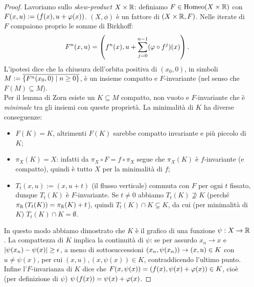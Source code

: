 \begin{proof}Lavoriamo sullo \emph{skew-product} $X\times\mathbb{R}$: definiamo $F\in\operatorname{Homeo}(X\times\mathbb{R})$
con $F(x,u):=\left(f(x),u+\varphi(x)\right)$. $(X,\phi)$ è un fattore di $(X\times\mathbb{R},F)$.
Nelle iterate di $F$ compaiono proprio le somme di Birkhoff:
\[ F^n(x,u)=\left(f^n(x),u+\sum_{j=0}^{n-1}(\varphi\circ f^j)(x)\right). \]
L'ipotesi dice che la chiusura dell'orbita positiva di $(x_0,0)$, in simboli
$M:=\overline{\left\{F^n(x_0,0)\mid n\ge 0\right\}}$, è un insieme compatto e $F$-invariante (nel senso che $F(M)\subseteq M$). \\
Per il lemma di Zorn esiste un $K\subseteq M$ compatto, non vuoto e $F$-invariante che è \emph{minimale} tra gli insiemi
con queste proprietà. La minimalità di $K$ ha diverse conseguenze:
\begin{itemize}
	\item $F(K)=K$, altrimenti $F(K)$ sarebbe compatto invariante e più piccolo di $K$;
	\item $\pi_X(K)=X$: infatti da $\pi_X\circ F=f\circ\pi_X$ segue che $\pi_X(K)$ è $f$-invariante (e compatto),
	quindi è tutto $X$ per la minimalità di $f$;
	\item $T_t(x,u):=(x,u+t)$ (il flusso verticale) commuta con $F$ per ogni $t$ fissato, dunque
	$T_t(K)$ è $F$-invariante. Se $t\neq 0$ abbiamo $T_t(K)\nsupseteq K$ (perché $\pi_{\mathbb{R}}\left(T_t(K)\right)=\pi_{\mathbb{R}}(K)+t$),
	quindi $T_t(K)\cap K\subsetneq K$, da cui (per minimalità di $K$) $T_t(K)\cap K=\emptyset$.
\end{itemize}
In questo modo abbiamo dimostrato che $K$ è il grafico di una funzione $\psi:X\to\mathbb{R}$. La compattezza di $K$
implica la continuità di $\psi$: se per assurdo $x_n\to x$ e $\left|\psi(x_n)-\psi(x)\right|\ge\epsilon$,
a meno di sottosuccessioni $\left(x_n,\psi(x_n)\right)\to (x,u)\in K$ con $u\neq\psi(x)$, per cui
$(x,u),(x,\psi(x))\in K$, contraddicendo l'ultimo punto. \\
Infine l'$F$-invarianza di $K$ dice che $F(x,\psi(x))=\left(f(x),\psi(x)+\varphi(x)\right)\in K$, cioè (per definizione di $\psi$)
$\psi\left(f(x)\right)=\psi(x)+\varphi(x)$.
\end{proof}

